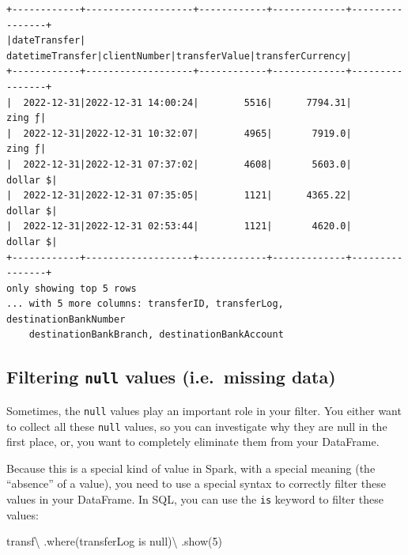 \documentclass[
  11pt,
  letterpaper,
  DIV=11,
  numbers=noendperiod]{scrreprt}
\newenvironment{Shaded}{\begin{snugshade}}{\end{snugshade}}
\newcommand{\DecValTok}[1]{\textcolor[rgb]{0.68,0.00,0.00}{#1}}
\newcommand{\NormalTok}[1]{\textcolor[rgb]{0.00,0.23,0.31}{#1}}
\newcommand{\OperatorTok}[1]{\textcolor[rgb]{0.37,0.37,0.37}{#1}}
\newcommand{\StringTok}[1]{\textcolor[rgb]{0.13,0.47,0.30}{#1}}
\begin{document}
\begin{verbatim}
+------------+-------------------+------------+-------------+----------------+
|dateTransfer|   datetimeTransfer|clientNumber|transferValue|transferCurrency|
+------------+-------------------+------------+-------------+----------------+
|  2022-12-31|2022-12-31 14:00:24|        5516|      7794.31|          zing ƒ|
|  2022-12-31|2022-12-31 10:32:07|        4965|       7919.0|          zing ƒ|
|  2022-12-31|2022-12-31 07:37:02|        4608|       5603.0|        dollar $|
|  2022-12-31|2022-12-31 07:35:05|        1121|      4365.22|        dollar $|
|  2022-12-31|2022-12-31 02:53:44|        1121|       4620.0|        dollar $|
+------------+-------------------+------------+-------------+----------------+
only showing top 5 rows
... with 5 more columns: transferID, transferLog, destinationBankNumber
    destinationBankBranch, destinationBankAccount
\end{verbatim}

\hypertarget{sec-filter-null-values}{%
\subsection{\texorpdfstring{Filtering \texttt{null} values (i.e.~missing
data)}{Filtering null values (i.e.~missing data)}}\label{sec-filter-null-values}}

Sometimes, the \texttt{null} values play an important role in your
filter. You either want to collect all these \texttt{null} values, so
you can investigate why they are null in the first place, or, you want
to completely eliminate them from your DataFrame.

Because this is a special kind of value in Spark, with a special meaning
(the ``absence'' of a value), you need to use a special syntax to
correctly filter these values in your DataFrame. In SQL, you can use the
\texttt{is} keyword to filter these values:

\begin{Shaded}
\begin{Highlighting}[]
\NormalTok{transf}\OperatorTok{\textbackslash{}}
\NormalTok{  .where(}\StringTok{\textquotesingle{}transferLog is null\textquotesingle{}}\NormalTok{)}\OperatorTok{\textbackslash{}}
\NormalTok{  .show(}\DecValTok{5}\NormalTok{)}
\end{Highlighting}
\end{Shaded}
\end{document}
